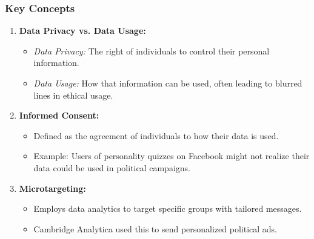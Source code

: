 \documentclass[aspectratio=169]{beamer}
\begin{document}
\begin{frame}[fragile]
    \frametitle{Key Concepts}
    \begin{enumerate}
        \item \textbf{Data Privacy vs. Data Usage:}
            \begin{itemize}
                \item \textit{Data Privacy:} The right of individuals to control their personal information.
                \item \textit{Data Usage:} How that information can be used, often leading to blurred lines in ethical usage.
            \end{itemize}
        
        \item \textbf{Informed Consent:}
            \begin{itemize}
                \item Defined as the agreement of individuals to how their data is used.
                \item Example: Users of personality quizzes on Facebook might not realize their data could be used in political campaigns.
            \end{itemize}
        
        \item \textbf{Microtargeting:}
            \begin{itemize}
                \item Employs data analytics to target specific groups with tailored messages.
                \item Cambridge Analytica used this to send personalized political ads.
            \end{itemize}
    \end{enumerate}
\end{frame}
\end{document}
